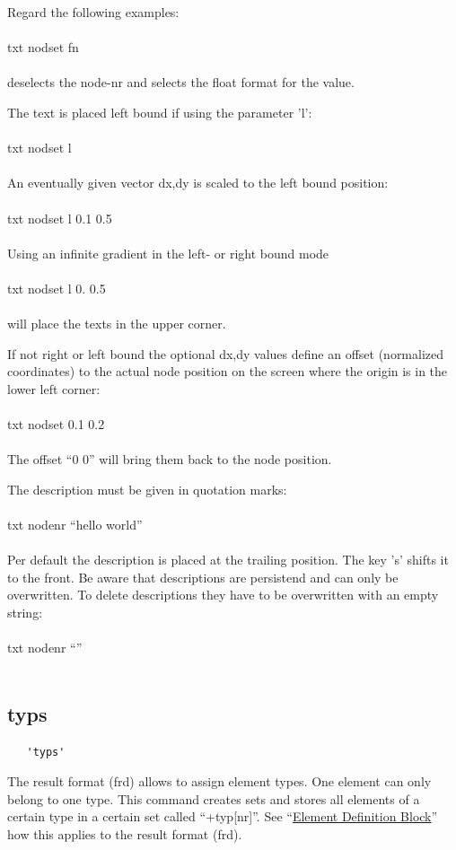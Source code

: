 \documentclass{article}
\providecommand{\htmlref}[2]{\hyperref[#2]{#1}}
\begin{document}
Regard the following examples:\\\\txt nodset fn\\\\deselects the node-nr and selects the float format for the value.

The text is placed left bound if using the parameter 'l':\\\\txt nodset l\\\\An eventually given vector dx,dy is scaled to the left bound position:\\\\txt nodset l 0.1 0.5\\\\Using an infinite gradient in the left- or right bound mode\\\\txt nodset l 0. 0.5\\\\will place the texts in the upper corner.

If not right or left bound the optional dx,dy values define an offset (normalized coordinates) to the actual node position on the screen where the origin is in the lower left corner:\\\\txt nodset 0.1 0.2\\\\The offset ``0 0'' will bring them back to the node position.

The description must be given in quotation marks:\\\\txt nodenr ``hello world''\\\\Per default the description is placed at the trailing position. The key 's' shifts it to the front. Be aware that descriptions are persistend and can only be overwritten. To delete descriptions they have to be overwritten with an empty string:\\\\txt nodenr ``''\\\\


\subsection{\label{typs}typs}
\begin{verbatim}
   'typs'
\end{verbatim}
The result format (frd) allows to assign element types. One element can only belong to one type. This command creates sets and stores all elements of a certain type in a certain set called ``+typ[nr]''. See ``\htmlref{Element Definition Block}{Element Definition Block}'' how this applies to the result format (frd).
\end{document}
